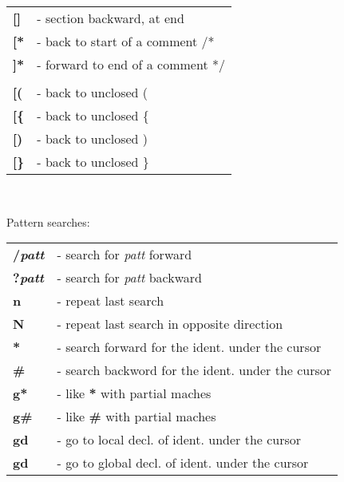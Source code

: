 \documentclass[a4paper,8pt]{extarticle}
\begin{document}
\begin{multicols*}{3}
\begin{tabular}{ l l }
            \textbf{[]}                         &    - section backward, at end                             \\
            \textbf{[*}                         &    - back to start of a comment /*                        \\
            \textbf{]*}                         &    - forward to end of a comment */                       \\
                                                &                                                           \\
            \textbf{[(}                         &    - back to unclosed (                                   \\
            \textbf{[\{}                        &    - back to unclosed \{                                  \\
            \textbf{[)}                         &    - back to unclosed )                                   \\
            \textbf{[\}}                        &    - back to unclosed \}                                  \\
        \end{tabular}\\

        \columnbreak

        \noindent
        {\large Pattern searches:}\\
        \begin{tabular}{ l l }
            \textbf{/\textsl{patt}}             &    - search for \textsl{patt} forward                     \\
            \textbf{?\textsl{patt}}             &    - search for \textsl{patt} backward                    \\
            \textbf{n}                          &    - repeat last search                                   \\
            \textbf{N}                          &    - repeat last search in opposite direction             \\
            \textbf{*}                          &    - search forward for the ident. under the cursor       \\
            \textbf{\#}                         &    - search backword for the ident. under the cursor      \\
            \textbf{g*}                         &    - like \textbf{*} with partial maches                  \\
            \textbf{g\#}                        &    - like \textbf{\#} with partial maches                 \\
            \textbf{gd}                         &    - go to local decl. of ident. under the cursor         \\
            \textbf{gd}                         &    - go to global decl. of ident. under the cursor        \\
        \end{tabular}\\


\end{multicols*}
\end{document}

